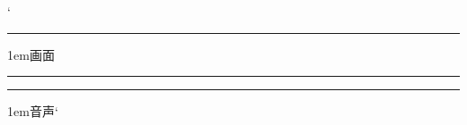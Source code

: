 \documentclass[b5j]{tbook}
\begin{document}
`
\begin{oframed}
		\rule[-0.5zh]{0.5mm}{3em}
		\hspace{5em}
		\raise1em\hbox{画\hspace{1em}面}
		\hspace{5em}
		\rule[-0.5zh]{0.5mm}{3em}
		\hspace{1em}
		\rule[-0.5zh]{0.5mm}{3em}
		\hspace{14em}
		\raise1em\hbox{音\hspace{1em}声}`
		\hspace{14em}
\end{oframed}


	


\end{document}
